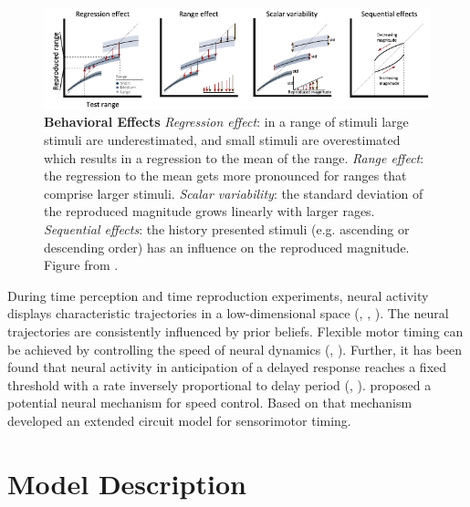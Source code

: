 \documentclass[9pt]{article}
\begin{document}
\begin{figure}[ht]
	\centering
	\includegraphics{figures/behavioural_effects_petzschner.pdf}
	\caption{\textbf{Behavioral Effects} 
	\textit{Regression effect}: in a range of stimuli large stimuli are underestimated, and small stimuli are overestimated which results in a regression to the mean of the range.
	\textit{Range effect}: the regression to the mean gets more pronounced for ranges that comprise larger stimuli. 
	\textit{Scalar variability}: the standard deviation of the reproduced magnitude grows linearly with larger rages. 
	\textit{Sequential effects}: the history presented stimuli (e.g. ascending or descending order) has an influence on the reproduced magnitude. 
	Figure from \cite{Petzschner2015}.}
	\label{fig:behavioraleffects}
\end{figure}

During time perception and time reproduction experiments, neural activity displays characteristic trajectories in a low-dimensional space (\cite{Meirhaeghe2021}, \cite{Wang2018}, \cite{Henke2021}). 
The neural trajectories are consistently influenced by prior beliefs. 
Flexible motor timing can be achieved by controlling the speed of neural dynamics (\cite{Sohn2019}, \cite{Wang2018}). 
Further, it has been found that neural activity in anticipation of a delayed response reaches a fixed threshold with a rate inversely proportional to delay period (\cite{Murakami2014}, \cite{Mita2009}).
\cite{Wang2018} proposed a potential neural mechanism for speed control. Based on that mechanism \cite{Egger2020} developed an extended circuit model for sensorimotor timing.

\section{Model Description}
\end{document}
